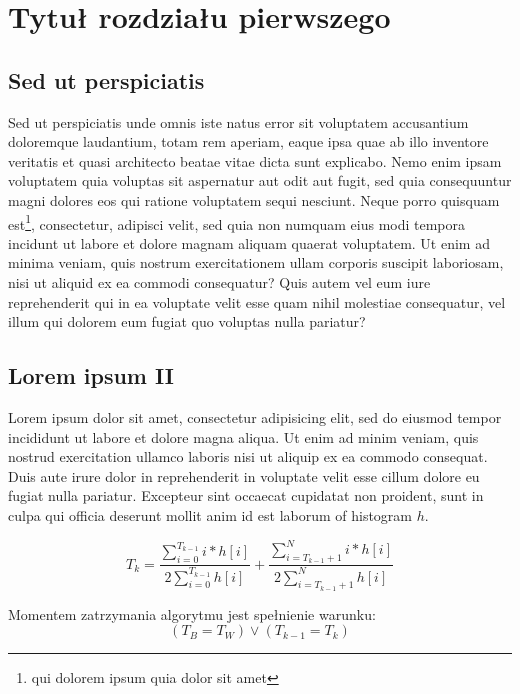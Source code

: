 \section{Tytuł rozdziału pierwszego}
\label{rozdzial1}

\subsection{Sed ut perspiciatis}
Sed ut perspiciatis unde omnis iste natus error sit voluptatem accusantium doloremque laudantium, totam rem aperiam, eaque ipsa quae ab illo inventore veritatis et quasi architecto beatae vitae dicta sunt explicabo. Nemo enim ipsam voluptatem quia voluptas sit aspernatur aut odit aut fugit, sed quia consequuntur magni dolores eos qui ratione voluptatem sequi nesciunt. Neque porro quisquam est\footnote{qui dolorem ipsum quia dolor sit amet}, consectetur, adipisci velit, sed quia non numquam eius modi tempora incidunt ut labore et dolore magnam aliquam quaerat voluptatem. Ut enim ad minima veniam, quis nostrum exercitationem ullam corporis suscipit laboriosam, nisi ut aliquid ex ea commodi consequatur? Quis autem vel eum iure reprehenderit qui in ea voluptate velit esse quam nihil molestiae consequatur, vel illum qui dolorem eum fugiat quo voluptas nulla pariatur?

\subsection{Lorem ipsum II}
\label{podrozdzial-Lorem2}

Lorem ipsum dolor sit amet, consectetur adipisicing elit, sed do eiusmod tempor incididunt ut labore et dolore magna aliqua. Ut enim ad minim veniam, quis nostrud exercitation ullamco laboris nisi ut aliquip ex ea commodo consequat. Duis aute irure dolor in reprehenderit in voluptate velit esse cillum dolore eu fugiat nulla pariatur. Excepteur sint occaecat cupidatat non proident, sunt in culpa qui officia deserunt mollit anim id est laborum of histogram $h$.

\begin{equation}
T_k = \frac{\displaystyle\sum_{i=0}^{T_{k-1}} i*h[i]}{\displaystyle 2 \sum_{i=0}^{T_{k-1}}h[i]} 
	+ \frac{\displaystyle\sum_{i=T_{k-1}+1}^{N} i*h[i]}{\displaystyle 2 \sum_{i=T_{k-1}+1}^{N}h[i]}
\end{equation}

Momentem zatrzymania algorytmu jest spełnienie warunku:
\begin{equation}
(T_B = T_W) \vee (T_{k-1} = T_k)
\end{equation}

